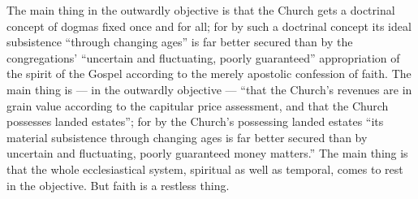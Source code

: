 \documentclass[12pt]{book}
\newcommand{\opage}[1]{\marginnote{\footnotesize\textit{[#1]}}}
\begin{document}
The main thing in the outwardly objective is that the Church
gets a doctrinal concept of dogmas fixed once and for all; for by such a
doctrinal concept its ideal
\opage{260}\setcounter{footnote}{0}%
subsistence ``through changing ages'' is far better secured than by the
congregations' ``uncertain and fluctuating, poorly guaranteed'' appropriation
of the spirit of the Gospel according to the merely apostolic confession of
faith. The main thing is --- in the outwardly objective --- ``that the
Church's revenues are in grain value according to the capitular price
assessment, and that the Church possesses landed estates''; for by the
Church's possessing landed estates ``its material subsistence through changing
ages is far better secured than by uncertain and fluctuating, poorly
guaranteed money matters.'' The main thing is that the whole ecclesiastical
system, spiritual as well as temporal, comes to rest in the objective. But
faith is a restless thing.
\end{document}
